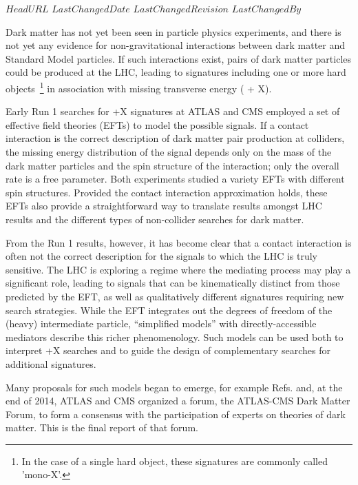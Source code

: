\svnidlong
{$HeadURL$}
{$LastChangedDate$}
{$LastChangedRevision$}
{$LastChangedBy$}

Dark matter has not yet been seen in particle physics experiments, and
there is not yet any evidence for non-gravitational interactions between dark
matter and Standard Model particles.  If such interactions exist,
pairs of dark matter particles could be produced at the LHC, leading
to signatures including one or more hard objects~\footnote{In the case of a single hard object, 
	these signatures are commonly called 'mono-X'.} in association with
missing transverse energy (\MET{} + X). 

Early Run 1 searches for \MET{}+X signatures at ATLAS and CMS employed
a set of effective field theories (EFTs) \cite{Goodman:2010ku} to
model the possible signals. If a contact interaction is the correct
description of dark matter pair production at colliders, the missing
energy distribution of the signal depends only on the mass of the dark
matter particles and the spin structure of the interaction; only the
overall rate is a free parameter. Both experiments studied a variety
EFTs with different spin structures. Provided the contact interaction
approximation holds, these EFTs also provide a straightforward way to
translate results amongst LHC results and the different types of
non-collider searches for dark matter.

From the Run 1 results, however, it has become clear
\cite{Busoni:2013lha} that a contact interaction is often not the
correct description for the signals to which the LHC is truly
sensitive. The LHC is exploring a regime where the mediating process
may play a significant role, leading to signals that can
be kinematically distinct from those predicted by the EFT, as well as
qualitatively different signatures requiring new search
strategies. While the EFT integrates out the degrees of freedom of the
(heavy) intermediate particle, ``simplified models''
\cite{Alves:2011wf} with directly-accessible mediators describe this
richer phenomenology. Such models can be used both to interpret \MET{}+X
searches and to guide the design of complementary searches for
additional signatures. 

Many proposals for such models began to emerge, for example
Refs. \cite{An:2012va,An:2012ue,Tait:2013,Buchmueller:2013dya,Bai:2013iqa,Bai:2014osa,An:201489115014,Yavin:14092893,Malik:2014ggr,Harris:2014hga,Buckley:2014fba}
and, at the end of 2014, ATLAS and CMS organized a forum, the
ATLAS-CMS Dark Matter Forum, to form a consensus with the
participation of experts on theories of dark matter. This is the final
report of that forum.

